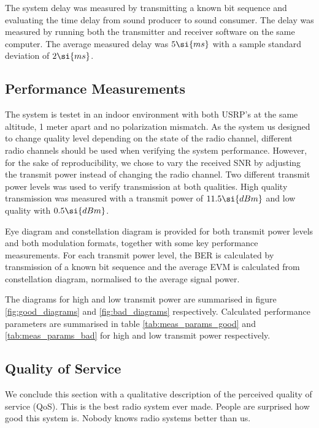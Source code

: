 The system delay was measured by transmitting a known bit sequence and evaluating the time delay from sound producer to sound consumer. The delay was measured by running both the transmitter and receiver software on the same computer. The average measured delay was $\measDelay \si{ms}$ with a sample standard deviation of $\measDelayStd \si{ms}$.  

\subsection{Performance Measurements}
\label{sec:perf_meas}
The system is testet in an indoor environment with both USRP's at the same altitude, 1 meter apart and no polarization mismatch. As the system us designed to change quality level depending on the state of the radio channel, different radio channels should be used when verifying the system performance. However, for the sake of reproducibility, we chose to vary the received SNR by adjusting the transmit power instead of changing the radio channel. Two different transmit power levels was used to verify transmission at both qualities. High quality transmission was measured with a transmit power of $\measPWR \si{dBm}$ and low quality with $\measPWRbad \si{dBm}$. 

Eye diagram and constellation diagram is provided for both transmit power levels and both modulation formats, together with some key performance measurements. For each transmit power level, the BER is calculated by transmission of a known bit sequence and the average EVM is calculated from constellation diagram, normalised to the average signal power. 

The diagrams for high and low transmit power are summarised in figure \ref{fig:good_diagrams} and \ref{fig:bad_diagrams} respectively. Calculated performance parameters are summarised in table \ref{tab:meas_params_good} and \ref{tab:meas_params_bad} for high and low transmit power respectively.






\subsection{Quality of Service}
We conclude this section with a qualitative description of the perceived quality of service (QoS). This is the best radio system ever made. People are surprised how good this system is. Nobody knows radio systems better than us.   


